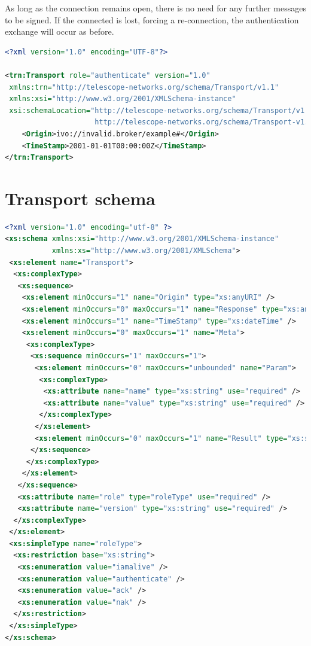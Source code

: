 \documentclass[a4paper,11pt]{ivoa}
\begin{document}
As long as the connection remains open, there is no need for any further
messages to be signed. If the connected is lost, forcing a re-connection, the
authentication exchange will occur as before.

\begin{lstlisting}[language=XML,caption=Sample \xmlel{authenticate} message.,
                   label=lst:authenticate]
<?xml version="1.0" encoding="UTF-8"?>

<trn:Transport role="authenticate" version="1.0"
 xmlns:trn="http://telescope-networks.org/schema/Transport/v1.1"
 xmlns:xsi="http://www.w3.org/2001/XMLSchema-instance"
 xsi:schemaLocation="http://telescope-networks.org/schema/Transport/v1.1
                     http://telescope-networks.org/schema/Transport-v1.1.xsd">
    <Origin>ivo://invalid.broker/example#</Origin>
    <TimeStamp>2001-01-01T00:00:00Z</TimeStamp>
</trn:Transport>
\end{lstlisting}

\newpage
\appendix

\section{Transport schema}
\label{sec:transportschema}

\begin{lstlisting}[language=XML]
<?xml version="1.0" encoding="utf-8" ?>
<xs:schema xmlns:xsi="http://www.w3.org/2001/XMLSchema-instance"
           xmlns:xs="http://www.w3.org/2001/XMLSchema">
 <xs:element name="Transport">
  <xs:complexType>
   <xs:sequence>
    <xs:element minOccurs="1" name="Origin" type="xs:anyURI" />
    <xs:element minOccurs="0" maxOccurs="1" name="Response" type="xs:anyURI" />
    <xs:element minOccurs="1" name="TimeStamp" type="xs:dateTime" />
    <xs:element minOccurs="0" maxOccurs="1" name="Meta">
     <xs:complexType>
      <xs:sequence minOccurs="1" maxOccurs="1">
       <xs:element minOccurs="0" maxOccurs="unbounded" name="Param">
        <xs:complexType>
         <xs:attribute name="name" type="xs:string" use="required" />
         <xs:attribute name="value" type="xs:string" use="required" />
        </xs:complexType>
       </xs:element>
       <xs:element minOccurs="0" maxOccurs="1" name="Result" type="xs:string" />
      </xs:sequence>
     </xs:complexType>
    </xs:element>
   </xs:sequence>
   <xs:attribute name="role" type="roleType" use="required" />
   <xs:attribute name="version" type="xs:string" use="required" />
  </xs:complexType>
 </xs:element>
 <xs:simpleType name="roleType">
  <xs:restriction base="xs:string">
   <xs:enumeration value="iamalive" />
   <xs:enumeration value="authenticate" />
   <xs:enumeration value="ack" />
   <xs:enumeration value="nak" />
  </xs:restriction>
 </xs:simpleType>
</xs:schema>
\end{lstlisting}
\end{document}
